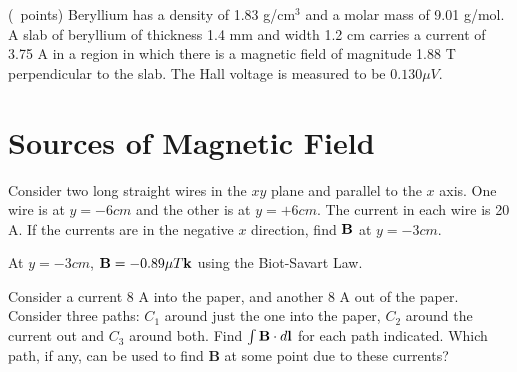 \begin{questions}
  \question (\totalpoints\ points) Beryllium has a density of 1.83
  g/cm$^3$ and a molar mass of 9.01 g/mol. A slab of beryllium of
  thickness 1.4 mm and width 1.2 cm carries a current of 3.75 A in a
  region in which there is a magnetic field of magnitude 1.88 T
  perpendicular to the slab. The Hall voltage is measured to be $0.130
  \mu V$.



  \section{Sources of Magnetic Field}

  \question[2] Consider two long straight wires in the $xy$ plane and
  parallel to the $x$ axis. One wire is at $y = -6 cm$ and the other
  is at $y = +6 cm$. The current in each wire is 20 A. If the currents
  are in the negative $x$ direction, find ${\bf B}$ at $y = -3 cm$.

  \begin{solution}
    At $y = -3 cm$, ${\bf B} = -0.89 \mu T {\bf k}$ using the
    Biot-Savart Law.
  \end{solution}

  \question[4] Consider a current 8 A into the paper, and another 8 A
  out of the paper. Consider three paths: $C_1$ around just the one
  into the paper, $C_2$ around the current out and $C_3$ around
  both. Find $\int {\bf B} \cdot d{\bf l}$ for each path
  indicated. Which path, if any, can be used to find {\bf B} at some
  point due to these currents?


\end{questions}

